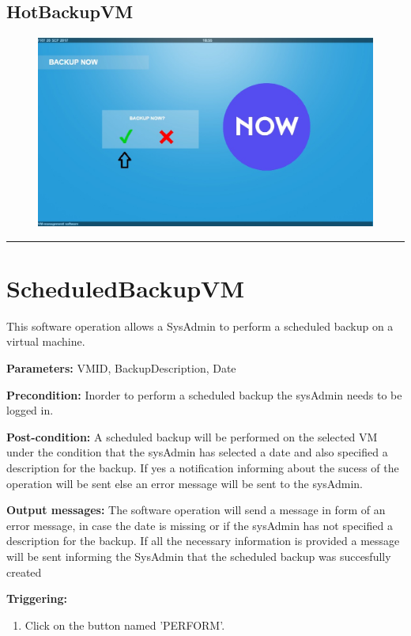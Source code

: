  
\subsection{HotBackupVM}

\begin{figure}[H]
\centering
\includegraphics[width=170mm]{images/hotback4.eps}
\caption{\label{overflow}}
\end{figure}


\hrule
\vspace{0.5cm}





\section{ScheduledBackupVM}
\label{operation:ScheduledBackupVM}
This software operation allows a SysAdmin to perform a scheduled backup on a
virtual machine.
\begin{description}

\item \textbf{Parameters:} VMID, BackupDescription, Date
\item \textbf{Precondition:} Inorder to perform a scheduled backup the sysAdmin 
needs to be logged in.
\item \textbf{Post-condition:} A scheduled backup will be performed on the
selected VM under the condition that the sysAdmin has selected a date and
also specified a description for the backup. If yes a notification informing
about the sucess of the operation will be sent else an error message will be
sent to the sysAdmin.
\item \textbf{Output messages:} The software operation will send a message in
form of an error message, in case the date is missing or if the sysAdmin has 
not specified a description for the backup. If all the necessary information
is provided a message will be sent informing the SysAdmin that the scheduled 
backup was succesfully created


\item \textbf{Triggering:}
\begin{enumerate}
\item Click on the button named 'PERFORM'.
\end{enumerate}

 
\end{description}



